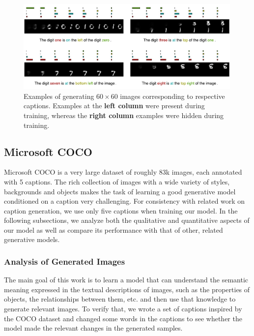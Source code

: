\documentclass{article} %
\begin{document}
\begin{figure}[!t]
\captionsetup[subfigure]{labelformat=empty}
\begin{center}
\includegraphics[width=0.99\textwidth]{figures/new/mnist/test3.pdf}\quad
%
\end{center}
\caption{Examples of generating $60 \times 60$ images corresponding to respective captions. Examples at the \textbf{left column} were present during training, whereas the \textbf{right column} examples were hidden during training.}
\label{fig:figmnist}
\vspace{-0.3cm}
\end{figure}

\subsection{Microsoft COCO}

Microsoft COCO \citep{mscoco} is a very large dataset of roughly 83k images, each annotated with 5 captions. The rich collection of images with a wide variety of styles, backgrounds and objects makes the task of learning a good generative model conditioned on a caption very challenging. For consistency with related work on caption generation, we use only five captions when training our model. In the following subsections, we analyze both the qualitative and quantitative aspects of our model as well as compare its performance with that of other, related generative models.

\subsubsection{Analysis of Generated Images}
The main goal of this work is to learn a model that can understand the semantic meaning expressed in the textual descriptions of images, such as the properties of objects, the relationships between them, etc. and then use that knowledge to generate relevant images. To verify that, we wrote a set of captions inspired by the COCO dataset and changed some words in the captions to see whether the model made the relevant changes in the generated samples.
\end{document}
